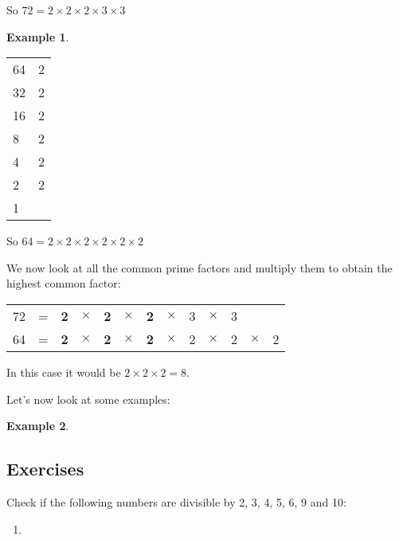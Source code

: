 \documentclass[11pt, oneside]{article}
\theoremstyle{definition}
\newtheorem{exmp}{Example}[section]
\begin{document}
So $72 = 2 \times 2 \times 2 \times 3 \times 3$

\begin{exmp} \end{exmp}
\begin{tabular}{ p{0.5cm} | p{1.5cm}}
64 & 2  \\
32 & 2  \\
16 & 2  \\
8 & 2  \\
4 & 2 \\
2 & 2 \\
1 
\end{tabular}

So $64 = 2 \times 2 \times 2 \times 2 \times 2 \times 2$

We now look at all the common prime factors and multiply them to obtain the highest common factor:

\begin{tabular}{c c c c c c c c c c c c c}
72 & = & {\bf2} & $\times $ & {\bf2} & $\times$  & {\bf2} & $\times$ & 3 & $\times $ & 3  &  &  \\
64 & = & {\bf2} & $\times $ & {\bf2} & $\times$  & {\bf2} & $\times$ & 2 & $\times $ & 2 & $\times $ & 2
\end{tabular}


In this case it would be $2\times 2\times 2 = 8$.



Let's now look at some examples:

\begin{exmp} \end{exmp}


\subsection{Exercises}
Check if the following numbers are divisible by 2, 3, 4, 5, 6, 9 and 10:
\begin{enumerate}
\item 
\end{enumerate}
\end{document}
